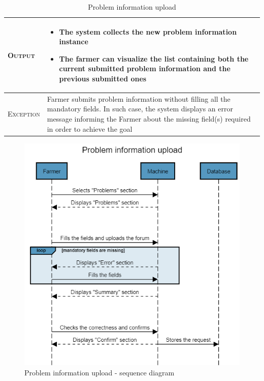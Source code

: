 \begin{table}[H]
\begin{tabular}{|l|p{}|}
    	\hline %
    	\textsc{Output}             &  \begin{itemize}
    	    \item The system collects the new problem information instance
    	    \item The farmer can visualize the list containing both the current submitted problem information and the previous submitted ones
    	\end{itemize}\\
    	\hline %
    	\textsc{Exception}         &   Farmer submits problem information without filling all the mandatory fields. In such case, the system displays an error message informing the Farmer about the missing field(s) required in order to achieve the goal\\
    	\hline %
        
    \end{tabular}

\caption{\label{tab:problem_information}Problem information upload}
\end{table}

\begin{figure}[H]
	\centering
    \includegraphics[page=1, width=\textwidth]{Images/Sequence diagrams/SW2- Problem information upload.png}
	\caption{\label{fig:good_practice_seq_diag}Problem information upload - sequence diagram}
\end{figure}

